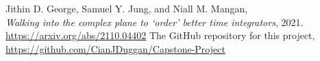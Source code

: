 \providecommand{\bysame}{\leavevmode\hbox to3em{\hrulefill}\thinspace}
\providecommand{\href}[2]{#2}
\renewcommand\refname{} %
\begin{thebibliography}{1}

Jithin D. George, Samuel Y. Jung, and Niall M. Mangan,\\
\emph{{W}alking into the complex plane to `order' better time integrators}, 2021.\\
\url{https://arxiv.org/abs/2110.04402}
The GitHub repository for this project,\\
\url{https://github.com/CianJDuggan/Capstone-Project}

\end{thebibliography}
